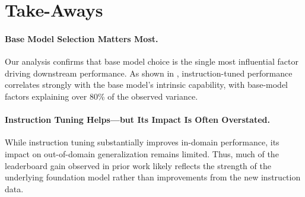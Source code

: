 \documentclass[11pt]{article}
\newcommand{\g}[0]{\color{mygray}}
\begin{document}





\section{Take-Aways}

\paragraph{Base Model Selection Matters Most.}
Our analysis confirms that base model choice is the single most influential factor driving downstream performance. 
As shown in , instruction-tuned performance correlates strongly with the base model’s intrinsic capability, with base-model factors explaining over 80\% of the observed variance.

\paragraph{Instruction Tuning Helps—but Its Impact Is Often Overstated.}
While instruction tuning substantially improves in-domain performance, its impact on out-of-domain generalization remains limited. 
Thus, much of the leaderboard gain observed in prior work likely reflects the strength of the underlying foundation model rather than improvements from the new instruction data.
\end{document}
